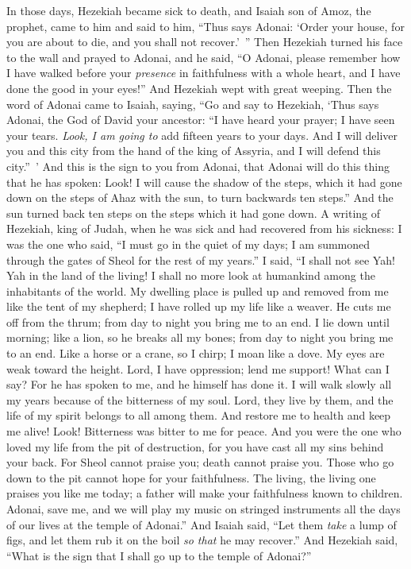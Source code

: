 \begin{biblechapter} %
 In those days, Hezekiah became sick to death, and Isaiah son of Amoz, the prophet, came to him and said to him, “Thus says Adonai: ‘Order your house, for you are about to die, and you shall not recover.’ ”
\verse Then Hezekiah turned his face to the wall and prayed to Adonai,
\verse and he said, “O Adonai, please remember how I have walked before your \textit{presence} in faithfulness with a whole heart, and I have done the good in your eyes!” And Hezekiah wept with great weeping.
\verse Then the word of Adonai came to Isaiah, saying,
\verse “Go and say to Hezekiah, ‘Thus says Adonai, the God of David your ancestor: “I have heard your prayer; I have seen your tears. \textit{Look, I am going to} add fifteen years to your days.
\verse And I will deliver you and this city from the hand of the king of Assyria, and I will defend this city.” ’
\verse And this is the sign to you from Adonai, that Adonai will do this thing that he has spoken:
\verse Look! I will cause the shadow of the steps, which it had gone down on the steps of Ahaz with the sun, to turn backwards ten steps.” And the sun turned back ten steps on the steps which it had gone down.
\verse A writing of Hezekiah, king of Judah, when he was sick and had recovered from his sickness:
\verse I was the one who said, “I must go in the quiet of my days; 
I am summoned through the gates of Sheol for the rest of my years.”
\verse I said, “I shall not see Yah! Yah in the land of the living! 
I shall no more look at humankind among the inhabitants of the world.
\verse My dwelling place is pulled up and removed from me like the tent of my shepherd; 
I have rolled up my life like a weaver. 
He cuts me off from the thrum; 
from day to night you bring me to an end.
\verse I lie down until morning; 
like a lion, so he breaks all my bones; 
from day to night you bring me to an end.
\verse Like a horse or a crane, so I chirp; 
I moan like a dove. 
My eyes are weak toward the height. 
Lord, I have oppression; lend me support!
\verse What can I say? For he has spoken to me, 
and he himself has done it. 
I will walk slowly all my years because of the bitterness of my soul.
\verse Lord, they live by them, and the life of my spirit belongs to all among them. 
And restore me to health and keep me alive!
\verse Look! Bitterness was bitter to me for peace. 
And you were the one who loved my life from the pit of destruction, 
for you have cast all my sins behind your back.
\verse For Sheol cannot praise you; death cannot praise you. 
Those who go down to the pit cannot hope for your faithfulness.
\verse The living, the living one praises you like me today; 
a father will make your faithfulness known to children.
\verse Adonai, save me, and we will play my music on stringed instruments all the days of our lives at the temple of Adonai.”
\verse And Isaiah said, “Let them \textit{take} a lump of figs, and let them rub it on the boil \textit{so that} he may recover.”
\verse And Hezekiah said, “What is the sign that I shall go up to the temple of Adonai?”
\end{biblechapter}

